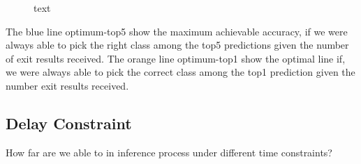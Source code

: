 \begin{figure}
	\centering
	\hfill
	\caption[short text]{text}
	\label{fig:info-combi}
\end{figure}

The blue line optimum-top5 show the maximum achievable accuracy, if we were always able to pick the right class among the top5 predictions given the number of exit results received. The orange line optimum-top1 show the optimal line if, we were always able to pick the correct class among the top1 prediction given the number exit results received.

\subsection{Delay Constraint}

How far are we able to in inference process under different time constraints? 


